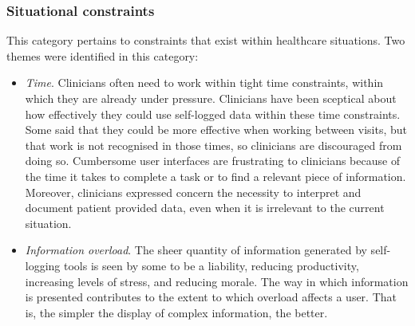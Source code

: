 \documentclass{sigchi}
\begin{document}
\subsubsection{Situational constraints}

This category pertains to constraints that exist within healthcare situations. Two themes were identified in this category:

\begin{itemize}
    \item \textit{Time}. Clinicians often need to work within tight time constraints, within which they are already under pressure. Clinicians have been sceptical about how effectively they could use self-logged data within these time constraints. Some said that they could be more effective when working between visits, but that work is not recognised in those times, so clinicians are discouraged from doing so. Cumbersome user interfaces are frustrating to clinicians because of the time it takes to complete a task or to find a relevant piece of information. Moreover, clinicians expressed concern the necessity to interpret and document patient provided data, even when it is irrelevant to the current situation.
    
    \item \textit{Information overload}. The sheer quantity of information generated by self-logging tools is seen by some to be a liability, reducing  productivity, increasing levels of stress, and reducing morale. The way in which information is presented contributes to the extent to which overload affects a user.  That is, the simpler the display of complex information, the better.
    
\end{itemize}


\end{document}
